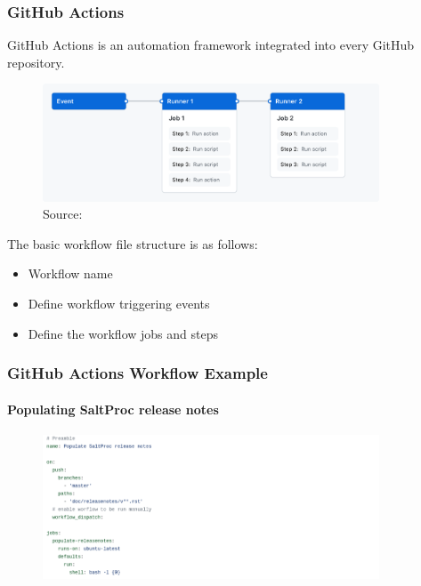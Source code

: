\begin{frame}
    \frametitle{GitHub Actions}
    
    GitHub Actions is an automation framework integrated into every GitHub repository.

    \begin{figure}[htpb]
        \centering
        \includegraphics[width=10cm]{images/overview-actions-simple}
        {\tiny Source: \cite{github_actions_conceptual_example}}
    \end{figure}

    The basic workflow file structure is as follows:
    \begin{itemize}
        \item Workflow name
        \item Define workflow triggering events
        \item Define the workflow jobs and steps
    \end{itemize}

\end{frame}

\begin{frame}
    \frametitle{GitHub Actions Workflow Example}
    \framesubtitle{Populating SaltProc release notes}

    \begin{figure}[htpb]
        \centering
        \includegraphics[width=10cm]{images/github_actions_workflow_ex1}
    \end{figure}

\end{frame}

